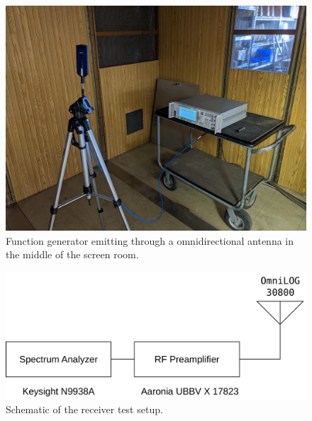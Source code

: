 \documentclass[12pt,a4paper,oneside]{article}
\begin{document}
\begin{figure}[H]
	\centering
	\includegraphics[width=0.9\linewidth]{images/function_generator.jpg}
	\caption{Function generator emitting through a omnidirectional antenna in the middle of the screen room.}
	\label{fig:function_generator}
\end{figure}

\begin{figure}[H]
\centering
\includegraphics[width=0.8\linewidth]{images/schematics/receiver.png}
\caption{Schematic of the receiver test setup.}
\label{fig:schematic_receiver}
\end{figure}
\end{document}
